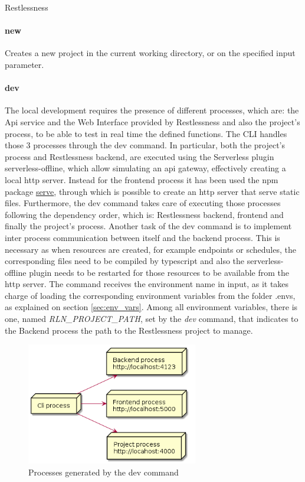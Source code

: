 \begin{chapter}{Restlessness}
    \paragraph{new}
    Creates a new project in the current working directory, or on the specified
    input parameter.

    \paragraph{dev}
    \label{dev_command}
    The local development requires the presence of different processes, which are:
    the Api service and the Web Interface provided by Restlessness and also the
    project's process, to be able to test in real time the defined functions. The
    CLI handles those 3 processes through the dev command.
    In particular, both the project's process and Restlessness backend, are executed
    using the Serverless plugin serverless-offline, which allow simulating an api
    gateway, effectively creating a local http server.
    Instead for the frontend process it has been used the npm package
    \href{https://www.npmjs.com/package/serve}{serve}, through which is possible
    to create an http server that serve static files.
    Furthermore, the dev command takes care of executing those processes following the
    dependency order, which is: Restlessness backend, frontend and finally the
    project's process.
    Another task of the dev command is to implement inter process communication between
    itself and the backend process. This is necessary as when resources are created,
    for example endpoints or schedules, the corresponding files need to be compiled by
    typescript and also the serverless-offline plugin needs to be restarted for those
    resources to be available from the http server.
    The command receives the environment name in input, as it takes charge of loading
    the corresponding environment variables from the folder .envs, as explained on
    section \ref{sec:env_vars}. Among all environment variables, there is one, named
    \mbox{\textit{RLN\_PROJECT\_PATH}}, set by the \textit{dev} command, that indicates
    to the Backend process the path to the Restlessness project to manage.
    \begin{figure}
        \centering
        \includegraphics[width=7.5cm]{source/diagrams/rln_dev_processes.png}
        \caption{Processes generated by the dev command}
    \end{figure}


\end{chapter}
